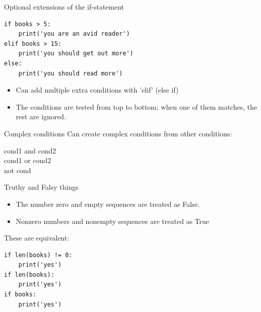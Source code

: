 \documentclass[aspectratio=169,usenames,dvipsnames]{beamer}
\begin{document}
\begin{frame}[fragile]{Optional extensions of the if-statement}
\begin{lstlisting}
if books > 5:
    print('you are an avid reader')
elif books > 15:
    print('you should get out more')
else:
    print('you should read more')
\end{lstlisting}

\begin{itemize}
    \item Can add multiple extra conditions with 'elif' (else if)
    \item The conditions are tested from top to bottom;
            when one of them matches, the rest are ignored.
\end{itemize}
\end{frame}


\begin{frame}{Complex conditions}
    Can create complex conditions from other conditions:
    
    \begin{description}
        \item[cond1 and cond2]
        \item[cond1 or cond2]
        \item[not cond]
    \end{description}

\end{frame}

\begin{frame}[fragile]{Truthy and Falsy things}
\begin{itemize}
\item The number zero and empty sequences are treated as False.
\item Nonzero numbers and nonempty sequences are treated as True
\end{itemize}

These are equivalent:
\begin{lstlisting}
if len(books) != 0:
    print('yes')    
if len(books):
    print('yes')    
if books:
    print('yes')    
\end{lstlisting}

\end{frame}
\end{document}
